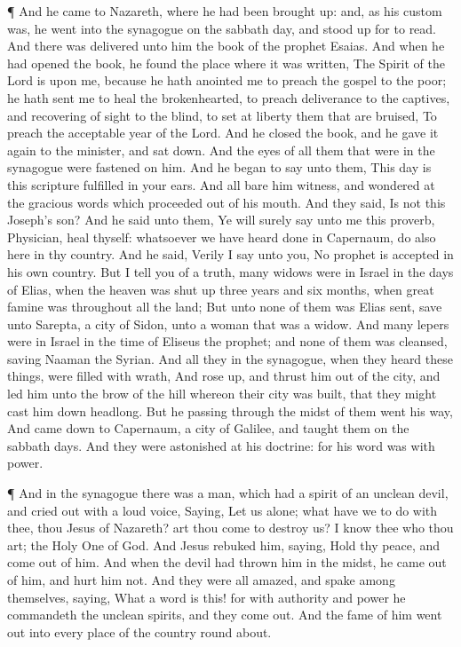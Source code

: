  ¶ And he came to Nazareth, where he had been brought up:
and, as his custom was, he went into the synagogue on the sabbath day,
and stood up for to read.  And there was delivered unto him
the book of the prophet Esaias. And when he had opened the book, he
found the place where it was written,  The Spirit of the
Lord is upon me, because he hath anointed me to preach the gospel to the
poor; he hath sent me to heal the brokenhearted, to preach deliverance
to the captives, and recovering of sight to the blind, to set at liberty
them that are bruised,  To preach the acceptable year of
the Lord.  And he closed the book, and he gave it again to
the minister, and sat down. And the eyes of all them that were in the
synagogue were fastened on him.  And he began to say unto
them, This day is this scripture fulfilled in your ears. 
And all bare him witness, and wondered at the gracious words which
proceeded out of his mouth. And they said, Is not this Joseph's son?
 And he said unto them, Ye will surely say unto me this
proverb, Physician, heal thyself: whatsoever we have heard done in
Capernaum, do also here in thy country.  And he said,
Verily I say unto you, No prophet is accepted in his own country.
 But I tell you of a truth, many widows were in Israel in
the days of Elias, when the heaven was shut up three years and six
months, when great famine was throughout all the land;  But
unto none of them was Elias sent, save unto Sarepta, a city of Sidon,
unto a woman that was a widow.  And many lepers were in
Israel in the time of Eliseus the prophet; and none of them was
cleansed, saving Naaman the Syrian.  And all they in the
synagogue, when they heard these things, were filled with wrath,
 And rose up, and thrust him out of the city, and led him
unto the brow of the hill whereon their city was built, that they might
cast him down headlong.  But he passing through the midst
of them went his way,  And came down to Capernaum, a city
of Galilee, and taught them on the sabbath days.  And they
were astonished at his doctrine: for his word was with power.

 ¶ And in the synagogue there was a man, which had a spirit
of an unclean devil, and cried out with a loud voice, 
Saying, Let us alone; what have we to do with thee, thou Jesus of
Nazareth? art thou come to destroy us? I know thee who thou art; the
Holy One of God.  And Jesus rebuked him, saying, Hold thy
peace, and come out of him. And when the devil had thrown him in the
midst, he came out of him, and hurt him not.  And they were
all amazed, and spake among themselves, saying, What a word is this! for
with authority and power he commandeth the unclean spirits, and they
come out.  And the fame of him went out into every place of
the country round about.

